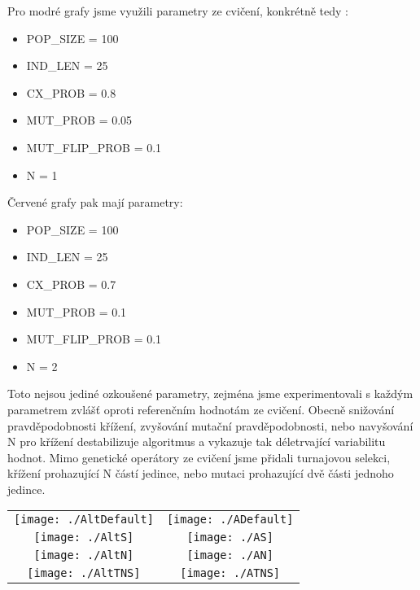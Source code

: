 \documentclass[a4paper]{article}
\newenvironment{ukol}[2][]{\begin{trivlist} 
\item[\hskip \labelsep {\bfseries #1}\hskip \labelsep {\bfseries #2}]}{\end{trivlist}}
\begin{document}
\begin{ukol}{Střídavé hodnoty}

Pro modré grafy jsme využili parametry ze cvičení, konkrétně tedy :

\begin{itemize}
	\item POP\_SIZE = 100
	\item IND\_LEN = 25
	\item CX\_PROB = 0.8
	\item MUT\_PROB = 0.05
	\item MUT\_FLIP\_PROB = 0.1
	\item N = 1
\end{itemize}

Červené grafy pak mají parametry:

\begin{itemize}
	\item POP\_SIZE = 100
	\item IND\_LEN = 25
	\item CX\_PROB = 0.7
	\item MUT\_PROB = 0.1
	\item MUT\_FLIP\_PROB = 0.1
	\item N = 2
\end{itemize}

Toto nejsou jediné ozkoušené parametry, zejména jsme experimentovali s každým parametrem zvlášť oproti referenčním hodnotám ze cvičení. Obecně snižování pravděpodobnosti křížení, zvyšování mutační pravděpodobnosti, nebo navyšování N pro křížení destabilizuje algoritmus a vykazuje tak déletrvající variabilitu hodnot. Mimo genetické operátory ze cvičení jsme přidali turnajovou selekci, křížení prohazující N částí jedince, nebo mutaci prohazující dvě části jednoho jedince.


\begin{center}
	\begin{tabular}{ c c }
	\texttt{[image: ./AltDefault]} & \texttt{[image: ./ADefault]} \\ 
	\texttt{[image: ./AltS]} & \texttt{[image: ./AS]} \\ 
	\texttt{[image: ./AltN]} & \texttt{[image: ./AN]} \\ 
	\texttt{[image: ./AltTNS]} & \texttt{[image: ./ATNS]} \\ 
	\end{tabular}
\end{center}


\end{ukol}
\end{document}
